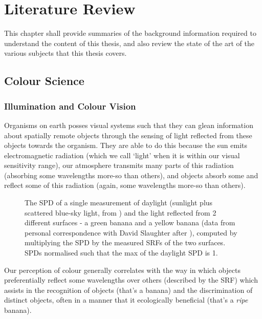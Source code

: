 \chapter{Literature Review}
\label{LitReview}

This chapter shall provide summaries of the background information required to understand the content of this thesis, and also review the state of the art of the various subjects that this thesis covers.

\section{Colour Science}

\subsection{Illumination and Colour Vision}

Organisms on earth posses visual systems such that they can glean information about spatially remote objects through the sensing of light reflected from these objects towards the organism. They are able to do this because the sun emits electromagnetic radiation (which we call `light' when it is within our visual sensitivity range), our atmosphere transmits many parts of this radiation (absorbing some wavelengths more-so than others), and objects absorb some and reflect some of this radiation (again, some wavelengths more-so than others).

\begin{figure}[htbp]
\caption{The \gls{SPD} of a single measurement of daylight (sunlight plus scattered blue-sky light, from \citet{hernandez-andres_color_2001}) and the light reflected from 2 different surfaces - a green banana and a yellow banana (data from personal correspondence with David Slaughter after \citet{li_optical_1997}), computed by multiplying the \gls{SPD} by the measured \glspl{SRF} of the two surfaces. \Glspl{SPD} normalised such that the max of the daylight \gls{SPD} is 1.}
\label{fig:SPD}
\end{figure}

Our perception of colour generally correlates with the way in which objects preferentially reflect some wavelengths over others (described by the \acrfull{SRF}) which assists in the recognition of objects (that's a banana) and the discrimination of distinct objects, often in a manner that it ecologically beneficial (that's a \emph{ripe} banana).

